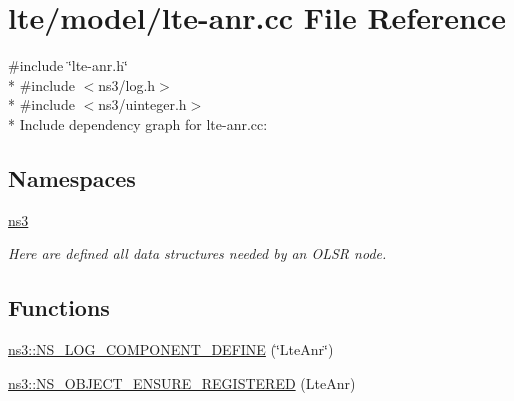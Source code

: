 \hypertarget{lte-anr_8cc}{}\section{lte/model/lte-\/anr.cc File Reference}
\label{lte-anr_8cc}
{\ttfamily \#include \char`\"{}lte-\/anr.\+h\char`\"{}}\\*
{\ttfamily \#include $<$ns3/log.\+h$>$}\\*
{\ttfamily \#include $<$ns3/uinteger.\+h$>$}\\*
Include dependency graph for lte-\/anr.cc\+:
\subsection*{Namespaces}
\begin{DoxyCompactItemize}
\item 
 \hyperlink{namespacens3}{ns3}
\begin{DoxyCompactList}\small\item\em Here are defined all data structures needed by an O\+L\+SR node. \end{DoxyCompactList}\end{DoxyCompactItemize}
\subsection*{Functions}
\begin{DoxyCompactItemize}
\item 
\hyperlink{namespacens3_afacca5b5de4eae3062ea88cb33ce12bd}{ns3\+::\+N\+S\+\_\+\+L\+O\+G\+\_\+\+C\+O\+M\+P\+O\+N\+E\+N\+T\+\_\+\+D\+E\+F\+I\+NE} (\char`\"{}Lte\+Anr\char`\"{})
\item 
\hyperlink{namespacens3_afdfeb9ab7560a0406abe1e6ae313eebc}{ns3\+::\+N\+S\+\_\+\+O\+B\+J\+E\+C\+T\+\_\+\+E\+N\+S\+U\+R\+E\+\_\+\+R\+E\+G\+I\+S\+T\+E\+R\+ED} (Lte\+Anr)
\end{DoxyCompactItemize}
